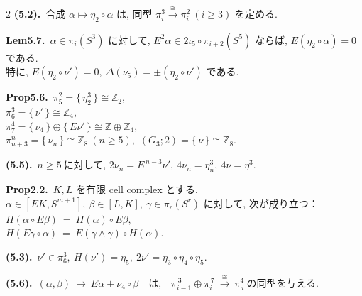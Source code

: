 \documentclass[10pt, leqno]{ltjsarticle}
\newcommand{\gen}[1]{\{\,#1\,\}}       %
\numberwithin{equation}{section}
\theoremstyle{plain}
\theoremstyle{definition}
\theoremstyle{remark}
\begin{document}
\begin{paracol}{2}
\noindent
\textbf{(5.2).}\
\(\text{合成 } \alpha\longmapsto \eta_2\circ \alpha \text{ は, 同型 } 
\pi^{3}_{i}\xrightarrow{\cong}\pi^{2}_{i}\ (i\ge3) 
\text{ を定める. }\)

\noindent
\textbf{Lem5.7.}\
\(\alpha\in\pi_i(S^3)\) に対して,
\(E^2\alpha\in2\iota_5\circ\pi_{i+2}(S^5)\) ならば, 
\(E(\eta_2\circ\alpha)=0\) である. \\
特に, \(E(\eta_2\circ\nu')=0, \ \Delta(\nu_5)=\pm(\eta_2\circ\nu')\) である. 

\noindent
\textbf{Prop5.6.}\
\(\pi^{2}_{5}=\gen{\eta_{2}^{3}}\cong \mathbb Z_{2},\) \\
\(\pi^{3}_{6}=\gen{\nu'}\cong \mathbb Z_{4},\) \\
\(\pi^{4}_{7}=\gen{\nu_{4}}\oplus \gen{E\nu'}\cong \mathbb Z\oplus\mathbb Z_{4},\) \\
\(\pi^{n}_{n+3}=\gen{\nu_{n}}\cong \mathbb Z_{8}\ (n\ge5),\)\qquad
\((G_{3};2)=\gen{\nu}\cong \mathbb Z_{8}.\)

\noindent
\textbf{(5.5).}\
\(n\ge5\ \text{に対して, } 2\nu_n=E^{\,n-3}\nu',\
4\nu_{n}=\eta_n^{3},\ 4\nu=\eta^{3}.\)

\noindent
\textbf{Prop2.2.}\
$K,L$ を有限 cell complex とする. \\
$\alpha\in[EK, S^{m+1}], \ \beta\in[L,K], \ \gamma\in\pi_r(S^r)$ 
に対して, 次が成り立つ：\\
\(
H(\alpha\circ E\beta)\ =\ H(\alpha)\circ E\beta,
\)\\
\(
H(E\gamma\circ\alpha)\ =\ E(\gamma\wedge\gamma)\circ H(\alpha).
\)

\noindent
\textbf{(5.3).}\
\(\nu'\in\pi_6^3,\ H(\nu')=\eta_5,\ 2\nu'=\eta_3\circ\eta_4\circ\eta_5 .\)

\noindent
\textbf{(5.6).}\
\((\alpha,\beta)\ \longmapsto\ E\alpha+\nu_{4}\circ\beta
\quad\text{は,}\quad
\pi^{\,3}_{i-1}\oplus \pi^{\,7}_{i}\ \xrightarrow{\ \cong\ }\ \pi_{\,i}^{4}
\ \text{の同型を与える. }\)



\end{paracol}
\end{document}

